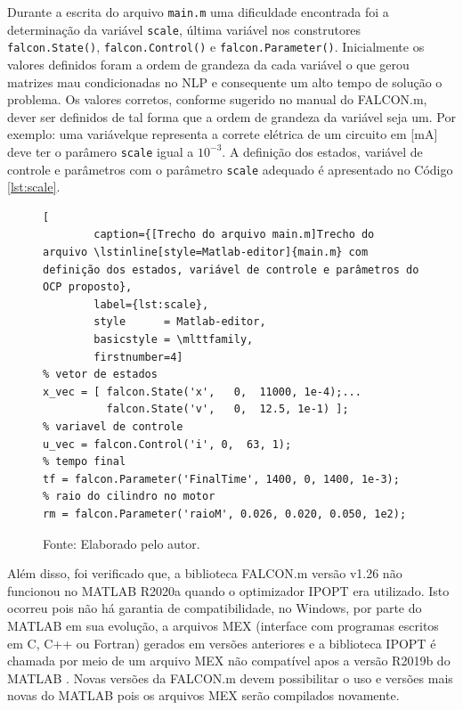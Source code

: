 Durante a escrita do arquivo \lstinline[style=Matlab-editor]{main.m} uma dificuldade encontrada foi a determinação da variável \lstinline[style=Matlab-editor]{scale}, 
última  variável nos construtores \lstinline[style=Matlab-editor]{falcon.State()}, \lstinline[style=Matlab-editor]{falcon.Control()} e \lstinline[style=Matlab-editor]{falcon.Parameter()}.
Inicialmente os valores definidos foram a ordem de grandeza da cada variável o que gerou matrizes mau condicionadas no NLP e consequente um alto tempo de solução o problema. 
Os valores corretos, conforme sugerido no manual do FALCON.m\cite{manual:Falcon}, dever ser definidos de tal forma que a ordem de grandeza da variável seja um. Por exemplo: uma variávelque
representa a correte elétrica de um circuito em [mA] deve ter o parâmero \lstinline[style=Matlab-editor]{scale} igual a $10^{-3}$. 
A definição dos estados, variável de controle e parâmetros com o parâmetro \lstinline[style=Matlab-editor]{scale} adequado é apresentado no Código \ref{lst:scale}. 

\begin{figure}[h]
    \begin{lstlisting}[
        caption={[Trecho do arquivo main.m]Trecho do arquivo \lstinline[style=Matlab-editor]{main.m} com definição dos estados, variável de controle e parâmetros do OCP proposto}, 
        label={lst:scale},
        style      = Matlab-editor,
        basicstyle = \mlttfamily,
        firstnumber=4]
% vetor de estados
x_vec = [ falcon.State('x',   0,  11000, 1e-4);...
          falcon.State('v',   0,  12.5, 1e-1) ];
% variavel de controle
u_vec = falcon.Control('i', 0,  63, 1);
% tempo final
tf = falcon.Parameter('FinalTime', 1400, 0, 1400, 1e-3);
% raio do cilindro no motor
rm = falcon.Parameter('raioM', 0.026, 0.020, 0.050, 1e2);
    \end{lstlisting}
    \caption*{\footnotesize{Fonte: Elaborado pelo autor.}}
\end{figure}

Além disso, foi verificado que, a biblioteca FALCON.m versão v1.26 não funcionou no MATLAB  R2020a quando o optimizador  IPOPT era utilizado.
Isto ocorreu pois não há garantia de compatibilidade, no Windows, por parte do MATLAB  em sua evolução, a arquivos MEX (interface com programas escritos em C, C++ ou Fortran) gerados em versões 
anteriores e a biblioteca IPOPT é chamada por meio de um arquivo MEX não compatível apos a versão R2019b do MATLAB . Novas versões da FALCON.m
devem possibilitar o uso e versões mais novas do MATLAB  pois os arquivos MEX serão compilados novamente.




\clearpage